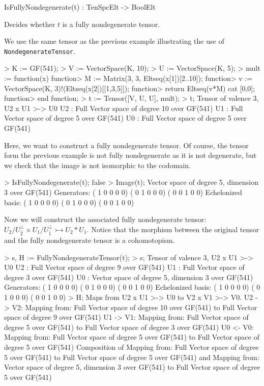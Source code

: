 \begin{intrinsics}
IsFullyNondegenerate(t) : TenSpcElt -> BoolElt
\end{intrinsics}

Decides whether $t$ is a fully nondegenerate tensor.

\begin{example}[FullyNondegenerate]

We use the same tensor as the previous example illustrating the use of \texttt{NondegenerateTensor}.
\begin{code}
> K := GF(541);
> V := VectorSpace(K, 10);
> U := VectorSpace(K, 5);
> mult := function(x)
function>   M := Matrix(3, 3, Eltseq(x[1])[2..10]);
function>   v := VectorSpace(K, 3)!(Eltseq(x[2])[[1,3,5]]);
function>   return Eltseq(v*M) cat [0,0];
function> end function;
> t := Tensor([V, U, U], mult);
> t;
Tensor of valence 3, U2 x U1 >-> U0
U2 : Full Vector space of degree 10 over GF(541)
U1 : Full Vector space of degree 5 over GF(541)
U0 : Full Vector space of degree 5 over GF(541)
\end{code}

Here, we want to construct a fully nondegenerate tensor. 
Of course, the tensor form the previous example is not fully nondegenerate as it is not degenerate, but we check that the image is not isomorphic to the codomain.
\begin{code}
> IsFullyNondegenerate(t);
false
> Image(t);
Vector space of degree 5, dimension 3 over GF(541)
Generators:
(  1   0   0   0   0)
(  0   1   0   0   0)
(  0   0   1   0   0)
Echelonized basis:
(  1   0   0   0   0)
(  0   1   0   0   0)
(  0   0   1   0   0)
\end{code}

Now we will construct the associated fully nondegenerate tensor: $U_2/U_{\widehat{2}}^\perp\times U_1/U_{\widehat{1}}^\perp\rightarrowtail U_2*U_1$.
Notice that the morphism between the original tensor and the fully nondegenerate tensor is a cohomotopism.
\begin{code}
> s, H := FullyNondegenerateTensor(t);
> s;
Tensor of valence 3, U2 x U1 >-> U0
U2 : Full Vector space of degree 9 over GF(541)
U1 : Full Vector space of degree 3 over GF(541)
U0 : Vector space of degree 5, dimension 3 over GF(541)
Generators:
(  1   0   0   0   0)
(  0   1   0   0   0)
(  0   0   1   0   0)
Echelonized basis:
(  1   0   0   0   0)
(  0   1   0   0   0)
(  0   0   1   0   0)
> H;
Maps from U2 x U1 >-> U0 to V2 x V1 >-> V0.
U2 -> V2: Mapping from: Full Vector space of degree 10 over GF(541) to
Full Vector space of degree 9 over GF(541)
U1 -> V1: Mapping from: Full Vector space of degree 5 over GF(541) to
Full Vector space of degree 3 over GF(541)
U0 <- V0: Mapping from: Full Vector space of degree 5 over GF(541) to
Full Vector space of degree 5 over GF(541)
Composition of Mapping from: Full Vector space of degree 5 over GF(541)
to Full Vector space of degree 5 over GF(541) and
Mapping from: Vector space of degree 5, dimension 3 over GF(541) to Full
Vector space of degree 5 over GF(541)
\end{code}
\end{example}

